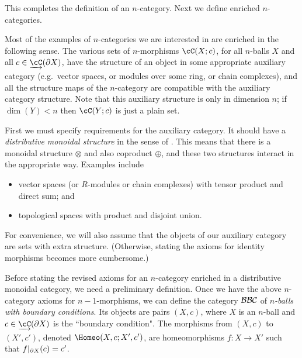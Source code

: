 \medskip

This completes the definition of an $n$-category.
Next we define enriched $n$-categories.

\medskip


Most of the examples of $n$-categories we are interested in are enriched in the following sense.
The various sets of $n$-morphisms $\cC(X; c)$, for all $n$-balls $X$ and
all $c\in \cl{\cC}(\bd X)$, have the structure of an object in some appropriate auxiliary category
(e.g.\ vector spaces, or modules over some ring, or chain complexes),
and all the structure maps of the $n$-category are compatible with the auxiliary
category structure.
Note that this auxiliary structure is only in dimension $n$; if $\dim(Y) < n$ then 
$\cC(Y; c)$ is just a plain set.

First we must specify requirements for the auxiliary category.
It should have a {\it distributive monoidal structure} in the sense of 
\cite{1010.4527}.
This means that there is a monoidal structure $\otimes$ and also coproduct $\oplus$,
and these two structures interact in the appropriate way.
Examples include 
\begin{itemize}
\item vector spaces (or $R$-modules or chain complexes) with tensor product and direct sum; and
\item topological spaces with product and disjoint union.
\end{itemize}
For convenience, we will also assume that the objects of our auxiliary category are sets with extra structure.
(Otherwise, stating the axioms for identity morphisms becomes more cumbersome.)

Before stating the revised axioms for an $n$-category enriched in a distributive monoidal category,
we need a preliminary definition.
Once we have the above $n$-category axioms for $n{-}1$-morphisms, we can define the 
category ${\mathcal{BBC}}$ of {\it $n$-balls with boundary conditions}.
Its objects are pairs $(X, c)$, where $X$ is an $n$-ball and $c \in \cl\cC(\bd X)$ is the ``boundary condition".
The morphisms from $(X, c)$ to $(X', c')$, denoted $\Homeo(X,c; X', c')$, are
homeomorphisms $f:X\to X'$ such that $f|_{\partial X}(c) = c'$.
 

